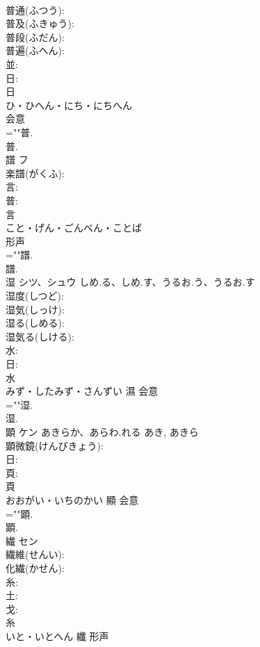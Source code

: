 \documentclass[8pt]{extreport}
\begin{document}
\begin{CJK}{UTF8}{min}
\\	普通(ふつう): 
\\	普及(ふきゅう): 
\\	普段(ふだん): 
\\	普遍(ふへん): 
\\	並: 
\\	日: 
\\	日	
\\	ひ・ひへん・にち・にちへん	
\\	会意 
\\	=""普.
\\	普.
\\	譜	フ			
\\	楽譜(がくふ): 
\\	言: 
\\	普: 
\\	言	
\\	こと・げん・ごんべん・ことば	
\\	形声 
\\	=""譜.
\\	譜.
\\	湿	シツ、シュウ	しめ.る、しめ.す、うるお.う、うるお.す		
\\	湿度(しつど): 
\\	湿気(しっけ): 
\\	湿る(しめる): 
\\	湿気る(しける): 
\\	水: 
\\	日: 
\\	水	
\\	みず・したみず・さんずい	濕	会意 
\\	=""湿.
\\	湿.
\\	顕	ケン	あきらか、あらわ.れる	あき, あきら	
\\	顕微鏡(けんびきょう): 
\\	日: 
\\	頁: 
\\	頁	
\\	おおがい・いちのかい	顯	会意 
\\	=""顕.
\\	顕.
\\	繊	セン			
\\	繊維(せんい): 
\\	化繊(かせん): 
\\	糸: 
\\	土: 
\\	戈: 
\\	糸	
\\	いと・いとへん	纖	形声 

\end{CJK}
\end{document}
